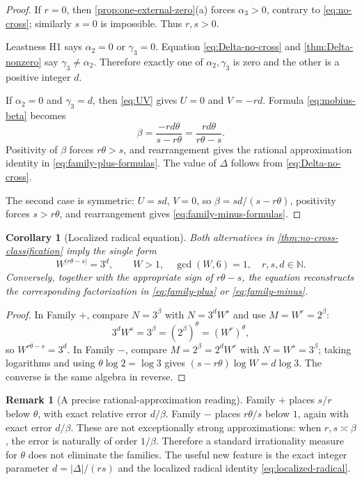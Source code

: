 \documentclass[11pt,oneside]{article}
\theoremstyle{research}
\newtheorem{corollary}[theorem]{Corollary}
\theoremstyle{definition}
\newtheorem{remark}[theorem]{Remark}
\newcommand{\N}{\mathbb N}
\begin{document}
\begin{proof}
If $r=0$, then \cref{prop:one-external-zero}(a) forces
$\alpha_3>0$, contrary to \eqref{eq:no-cross}; similarly $s=0$ is impossible.
Thus $r,s>0$.

Leastness H1 says $\alpha_2=0$ or $\gamma_3=0$.  Equation
\eqref{eq:Delta-no-cross} and \cref{thm:Delta-nonzero} say
$\gamma_3\ne\alpha_2$.  Therefore exactly one of $\alpha_2,\gamma_3$ is zero
and the other is a positive integer $d$.

If $\alpha_2=0$ and $\gamma_3=d$, then \eqref{eq:UV} gives
$U=0$ and $V=-rd$.  Formula \eqref{eq:mobius-beta} becomes
\[
 \beta=\frac{-rd\theta}{s-r\theta}
 =\frac{rd\theta}{r\theta-s}.
\]
Positivity of $\beta$ forces $r\theta>s$, and rearrangement gives the rational
approximation identity in \eqref{eq:family-plus-formulas}.  The value of
$\Delta$ follows from \eqref{eq:Delta-no-cross}.

The second case is symmetric: $U=sd$, $V=0$, so
$\beta=sd/(s-r\theta)$, positivity forces $s>r\theta$, and rearrangement gives
\eqref{eq:family-minus-formulas}.
\end{proof}

\begin{corollary}[Localized radical equation]
\label{cor:localized-radical}
Both alternatives in \cref{thm:no-cross-classification} imply the single form
\begin{equation}
 \boxed{W^{|r\theta-s|}=3^d,}
 \qquad
 W>1,
 \quad \gcd(W,6)=1,
 \quad r,s,d\in\N.
 \label{eq:localized-radical}
\end{equation}
Conversely, together with the appropriate sign of $r\theta-s$, the equation
reconstructs the corresponding factorization in
\eqref{eq:family-plus} or \eqref{eq:family-minus}.
\end{corollary}

\begin{proof}
In Family $+$, compare $N=3^\beta$ with
$N=3^dW^s$ and use $M=W^r=2^\beta$:
\[
 3^dW^s=3^\beta=(2^\beta)^\theta=(W^r)^\theta,
\]
so $W^{r\theta-s}=3^d$.  In Family $-$, compare
$M=2^\beta=2^dW^r$ with $N=W^s=3^\beta$; taking logarithms and using
$\theta\log2=\log3$ gives $(s-r\theta)\log W=d\log3$.  The converse is the
same algebra in reverse.
\end{proof}

\begin{remark}[A precise rational-approximation reading]
Family $+$ places $s/r$ below $\theta$, with exact relative error
$d/\beta$.  Family $-$ places $r\theta/s$ below $1$, again with exact error
$d/\beta$.  These are not exceptionally strong approximations: when
$r,s\asymp\beta$, the error is naturally of order $1/\beta$.  Therefore a
standard irrationality measure for $\theta$ does not eliminate the families.
The useful new feature is the exact integer parameter $d=|\Delta|/(rs)$ and
the localized radical identity \eqref{eq:localized-radical}.
\end{remark}
\end{document}
